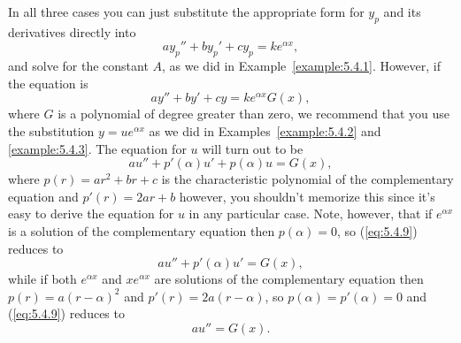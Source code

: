 \documentclass{ximera}
\begin{document}
 
In all three cases you can just substitute the appropriate form for
$y_p$ and its derivatives directly into
$$
ay_p''+by_p'+cy_p=ke^{\alpha x},
$$
and solve for the constant $A$, as we did in
Example~\ref{example:5.4.1}.
However, if the equation is
$$
ay''+by'+cy=k e^{\alpha x}G(x),
$$
where $G$ is a polynomial of degree greater than zero, we recommend
that you use the substitution $y=ue^{\alpha x}$ as we did in
Examples~\ref{example:5.4.2} and \ref{example:5.4.3}. The equation for $u$
will turn out to be
\begin{equation} \label{eq:5.4.9}
au''+p'(\alpha)u'+p(\alpha)u=G(x),
\end{equation}
where $p(r)=ar^2+br+c$ is the characteristic polynomial of the
complementary equation and $p'(r)=2ar+b$ %
however, you shouldn't memorize this since it's easy to derive the
equation for $u$ in any particular case. Note, however, that if
$e^{\alpha x}$ is a solution of the complementary equation then
$p(\alpha)=0$, so (\ref{eq:5.4.9}) reduces to
$$
au''+p'(\alpha)u'=G(x),
$$
while if both $e^{\alpha x}$ and $xe^{\alpha x}$ are solutions of the
complementary equation then $p(r)=a(r-\alpha)^2$ and
$p'(r)=2a(r-\alpha)$, so $p(\alpha)=p'(\alpha)=0$ and (\ref{eq:5.4.9})
reduces to
$$
au''=G(x).
$$
 
\end{document}
